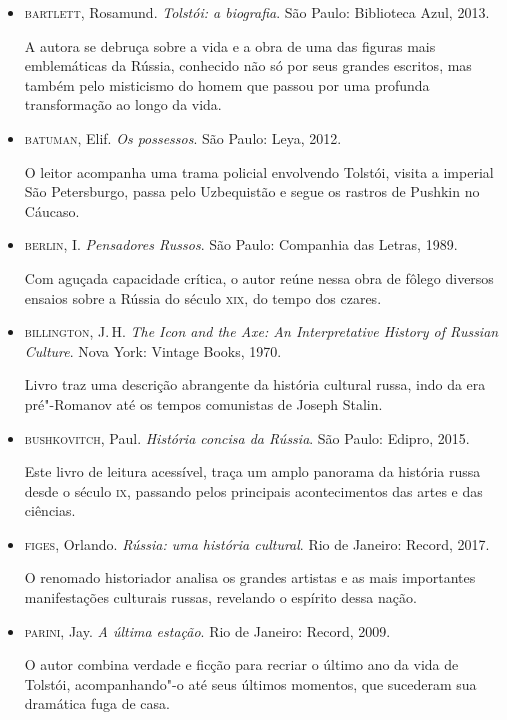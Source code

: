 \documentclass[12pt]{extarticle}
\begin{document}
\begin{itemize}
\item\textsc{bartlett}, Rosamund. \textit{Tolstói: a biografia}. São Paulo: Biblioteca Azul, 2013.

A autora se debruça sobre a vida e a obra de uma das figuras mais
emblemáticas da Rússia, conhecido não só por seus grandes escritos, mas
também pelo misticismo do homem que passou por uma profunda
transformação ao longo da vida.

\item\textsc{batuman}, Elif. \textit{Os possessos}. São Paulo: Leya, 2012.

O leitor acompanha uma trama policial envolvendo Tolstói, visita a
imperial São Petersburgo, passa pelo Uzbequistão e segue os rastros de
Pushkin no Cáucaso.

\item\textsc{berlin}, I. \textit{Pensadores Russos}. São Paulo: Companhia das Letras, 1989.

Com aguçada capacidade crítica, o autor reúne nessa obra de fôlego
diversos ensaios sobre a Rússia do século \textsc{xix}, do tempo dos czares.

\item\textsc{billington}, J.\,H. \textit{The Icon and the Axe: An Interpretative
History of Russian Culture}. Nova York: Vintage Books, 1970.

Livro traz uma descrição abrangente da história cultural russa, indo da
era pré"-Romanov até os tempos comunistas de Joseph Stalin.

\item\textsc{bushkovitch}, Paul. \textit{História concisa da Rússia}. São Paulo:
Edipro, 2015.

Este livro de leitura acessível, traça um amplo panorama da história
russa desde o século \textsc{ix}, passando pelos principais acontecimentos das
artes e das ciências.

\item\textsc{figes}, Orlando. \textit{Rússia: uma história cultural}. 
Rio de Janeiro: Record, 2017.

O renomado historiador analisa os grandes artistas e as mais importantes
manifestações culturais russas, revelando o espírito dessa nação.

\item\textsc{parini}, Jay. \textit{A última estação}. Rio de Janeiro: Record, 2009.

O autor combina verdade e ficção para recriar o último ano da vida de
Tolstói, acompanhando"-o até seus últimos momentos, que sucederam sua
dramática fuga de casa.



\end{itemize}
\end{document}
